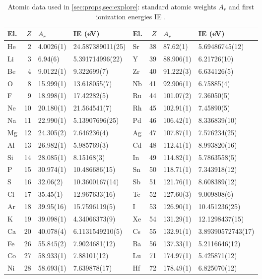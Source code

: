 \documentclass[11pt]{article}
\theoremstyle{definition}\newtheorem{definition}[theorem]{Definition}
\theoremstyle{remark}\newtheorem{remark}[theorem]{Remark}
\begin{document}
\begin{table}[htbp]\centering
\caption{Atomic data used in \cref{sec:props,sec:explore}: standard atomic weights $A_r$ \cite{CIAAW} and first ionization energies IE \cite{NIST}.}\label{tab:data}
\footnotesize\setlength{\tabcolsep}{4pt}
\begin{tabular}{@{}lrll@{\hspace{14pt}}lrll@{}}\toprule
El. & $Z$ & $A_r$ & IE (eV) & El. & $Z$ & $A_r$ & IE (eV)\\\midrule
He & 2 & 4.0026(1) & 24.587389011(25) & Sr & 38 & 87.62(1) & 5.69486745(12)\\
Li & 3 & 6.94(6) & 5.391714996(22) & Y & 39 & 88.906(1) & 6.21726(10)\\
Be & 4 & 9.0122(1) & 9.322699(7) & Zr & 40 & 91.222(3) & 6.634126(5)\\
O & 8 & 15.999(1) & 13.618055(7) & Nb & 41 & 92.906(1) & 6.75885(4)\\
F & 9 & 18.998(1) & 17.42282(5) & Ru & 44 & 101.07(2) & 7.36050(5)\\
Ne & 10 & 20.180(1) & 21.564541(7) & Rh & 45 & 102.91(1) & 7.45890(5)\\
Na & 11 & 22.990(1) & 5.13907696(25) & Pd & 46 & 106.42(1) & 8.336839(10)\\
Mg & 12 & 24.305(2) & 7.646236(4) & Ag & 47 & 107.87(1) & 7.576234(25)\\
Al & 13 & 26.982(1) & 5.985769(3) & Cd & 48 & 112.41(1) & 8.993820(16)\\
Si & 14 & 28.085(1) & 8.15168(3) & In & 49 & 114.82(1) & 5.7863558(5)\\
P & 15 & 30.974(1) & 10.486686(15) & Sn & 50 & 118.71(1) & 7.343918(12)\\
S & 16 & 32.06(2) & 10.3600167(14) & Sb & 51 & 121.76(1) & 8.608389(12)\\
Cl & 17 & 35.45(1) & 12.967633(16) & Te & 52 & 127.60(3) & 9.009808(6)\\
Ar & 18 & 39.95(16) & 15.7596119(5) & I & 53 & 126.90(1) & 10.451236(25)\\
K & 19 & 39.098(1) & 4.34066373(9) & Xe & 54 & 131.29(1) & 12.1298437(15)\\
Ca & 20 & 40.078(4) & 6.1131549210(5) & Cs & 55 & 132.91(1) & 3.89390572743(17)\\
Fe & 26 & 55.845(2) & 7.9024681(12) & Ba & 56 & 137.33(1) & 5.2116646(12)\\
Co & 27 & 58.933(1) & 7.88101(12) & Lu & 71 & 174.97(1) & 5.425871(12)\\
Ni & 28 & 58.693(1) & 7.639878(17) & Hf & 72 & 178.49(1) & 6.825070(12)\\

\end{tabular}
\end{table}
\end{document}
